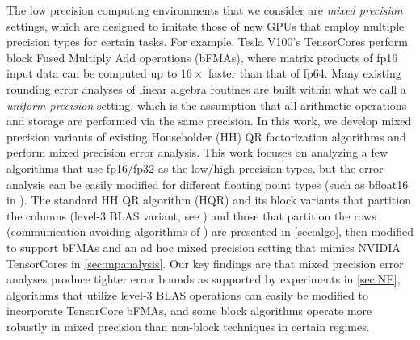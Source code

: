 \documentclass[review,onefignum,onetabnum]{siamart190516}
\begin{document}
The low precision computing environments that we consider are \emph{mixed precision} settings, which are designed to imitate those of new GPUs that employ multiple precision types for certain tasks. 
For example, Tesla V100's TensorCores perform block Fused Multiply Add operations (bFMAs), where matrix products of fp16 input data can be computed up to $16\times$ faster than that of fp64.
Many existing rounding error analyses of linear algebra routines are built within what we call a \emph{uniform precision} setting, which is the assumption that all arithmetic operations and storage are performed via the same precision.
In this work, we develop mixed precision variants of existing Householder (HH) QR factorization algorithms and perform mixed precision error analysis.
This work focuses on analyzing a few algorithms that use fp16/fp32 as the low/high precision types, but the error analysis can be easily modified for different floating point types (such as bfloat16 in \cite{tagliavini2018floating}).
The standard HH QR algorithm (HQR) and its block variants that partition the columns (level-3 BLAS variant, see \cite{golub2013matrix,Higham2002}) and those that partition the rows (communication-avoiding algorithms of \cite{Demmel2012}) are presented in \cref{sec:algo}, then modified to support bFMAs and an ad hoc mixed precision setting that mimics NVIDIA TensorCores in \cref{sec:mpanalysis}.
Our key findings are that mixed precision error analyses produce tighter error bounds as supported by experiments in \cref{sec:NE}, algorithms that utilize level-3 BLAS operations can easily be modified to incorporate TensorCore bFMAs, and some block algorithms operate more robustly in mixed precision than non-block techniques in certain regimes.
\end{document}
